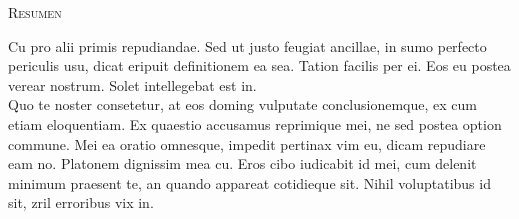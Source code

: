 \textsc{\Large Resumen}

Cu pro alii primis repudiandae. Sed ut justo feugiat ancillae, in sumo perfecto periculis usu, dicat eripuit definitionem ea sea. Tation facilis per ei. Eos eu postea verear nostrum. Solet intellegebat est in.\\[.2em]

Quo te noster consetetur, at eos doming vulputate conclusionemque, ex cum etiam eloquentiam. Ex quaestio accusamus reprimique mei, ne sed postea option commune. Mei ea oratio omnesque, impedit pertinax vim eu, dicam repudiare eam no. Platonem dignissim mea cu. Eros cibo iudicabit id mei, cum delenit minimum praesent te, an quando appareat cotidieque sit. Nihil voluptatibus id sit, zril erroribus vix in.


 
\tableofcontents